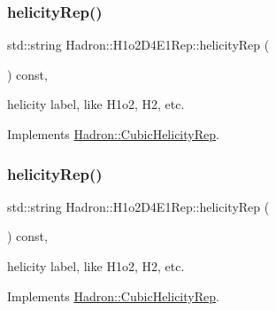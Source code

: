 \mbox{\label{structHadron_1_1H1o2D4E1Rep_a0cd96ec9108f20afcba53d3bce1540fc}} 
\subsubsection{\texorpdfstring{helicityRep()}{helicityRep()}\hspace{0.1cm}{\footnotesize\ttfamily [1/2]}}
{\footnotesize\ttfamily std\+::string Hadron\+::\+H1o2\+D4\+E1\+Rep\+::helicity\+Rep (\begin{DoxyParamCaption}{ }\end{DoxyParamCaption}) const\hspace{0.3cm}{\ttfamily [inline]}, {\ttfamily [virtual]}}

helicity label, like H1o2, H2, etc. 

Implements \mbox{\hyperlink{structHadron_1_1CubicHelicityRep_af1096946b7470edf0a55451cc662f231}{Hadron\+::\+Cubic\+Helicity\+Rep}}.

\mbox{\label{structHadron_1_1H1o2D4E1Rep_a0cd96ec9108f20afcba53d3bce1540fc}} 
\subsubsection{\texorpdfstring{helicityRep()}{helicityRep()}\hspace{0.1cm}{\footnotesize\ttfamily [2/2]}}
{\footnotesize\ttfamily std\+::string Hadron\+::\+H1o2\+D4\+E1\+Rep\+::helicity\+Rep (\begin{DoxyParamCaption}{ }\end{DoxyParamCaption}) const\hspace{0.3cm}{\ttfamily [inline]}, {\ttfamily [virtual]}}

helicity label, like H1o2, H2, etc. 

Implements \mbox{\hyperlink{structHadron_1_1CubicHelicityRep_af1096946b7470edf0a55451cc662f231}{Hadron\+::\+Cubic\+Helicity\+Rep}}.

\mbox{\label{structHadron_1_1H1o2D4E1Rep_a8657044b2491eb10846bc082432edb8e}} 
